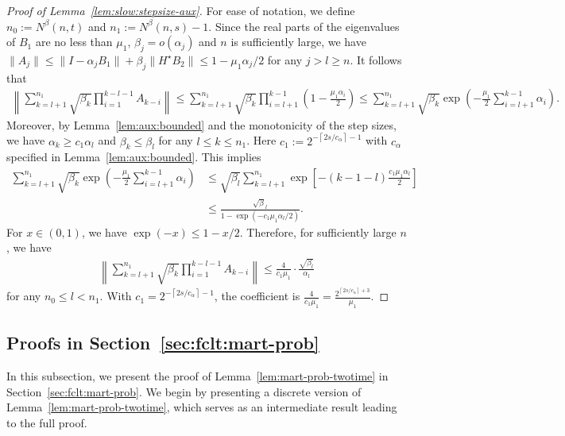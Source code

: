 \documentclass[11pt]{article}
\theoremstyle{plain}
\theoremstyle{definition}
\def\mI{{\bm{I}}}
\def\mI{{I}}
\begin{document}
\begin{appendix}
\begin{proof}[Proof of Lemma~\ref{lem:slow:stepsize-aux}]
    For ease of notation, we define $n_0 := N^\beta(n, t)$ and $n_1 := N^\beta(n, s)-1$.
    Since the real parts of the eigenvalues of $B_1$ are no less than $\mu_1$, $\beta_{j} = o(\alpha_{j})$ and $n$ is sufficiently large, we have $\| A_j \| \le \| \mI - \alpha_{j} B_1 \| + \beta_{j} \| H^\star B_2 \| \le  1 - \mu_1 \alpha_{j} / 2$ for any $j > l \ge n$.
    It follows that
    \begin{align*}
        \left\| \sum_{k=l+1}^{n_1} \sqrt{\beta_{k}} \prod_{i=1}^{k-l-1} A_{k-i}  \right\|
        \le \sum_{k=l+1}^{n_1} \sqrt{\beta_{k}} \prod_{i=l+1}^{k-1} \left( 1 {-} \frac{ \mu_1 \alpha_{i} }{2} \right)
        \le \sum_{k=l+1}^{n_1} \sqrt{\beta_{k}} \exp \left( - \frac{\mu_1}{2} \sum_{i=l+1}^{k-1} \alpha_{i} \right).
    \end{align*}
    Moreover, by Lemma~\ref{lem:aux:bounded} and the monotonicity of the step sizes, 
    we have
    $ \alpha_{k} \ge c_1 \alpha_{l}   $
    and $
    \beta_{k} \le \beta_{l}$ for any $l \le k \le n_1$.
    Here $c_1 := 2^{ -\left\lceil 2s/c_\alpha \right\rceil - 1}$ with $c_\alpha$ specified in Lemma~\ref{lem:aux:bounded}.
    This implies 
    \begin{align*}
        \sum_{k=l+1}^{n_1} \sqrt{\beta_{k}} \exp \left( - \frac{\mu_1}{2} \sum_{i=l+1}^{k-1} \alpha_{i} \right)
        & \le \sqrt{\beta_{l}} \sum_{k=l+1}^{n_1}  \exp \left[ - (k-1-l) \frac{c_1 \mu_1 \alpha_{l} }{2} \right] \\
        & \le \frac{ \sqrt{\beta}_{l} }{1 - \exp(- c_1 \mu_1 \alpha_{l} / 2) }.
    \end{align*}
    For $x \in (0,1)$, we have $\exp(-x) \le 1 - x/2$.
    Therefore, for sufficiently large $n$, we have
    \begin{align*}
        \left\| \sum_{k=l+1}^{n_1} \sqrt{\beta_{k}} \prod_{i=1}^{k-l-1} A_{k-i}  \right\|
        \le \frac{4  }{ c_1 \mu_1  } \cdot
        \frac{ \sqrt{\beta_{l} } }{ \alpha_{l} }
    \end{align*}
    for any $n_0 \le l < n_1$.
    With $c_1 = 2^{ -\left\lceil 2s/c_\alpha \right\rceil - 1}$, the coefficient is $\frac{4}{c_1 \mu_1} = \frac{ 2^{ \left\lceil 2s/c_\alpha \right\rceil + 3} }{\mu_1}$.
\end{proof}


\subsection{Proofs in Section~\ref{sec:fclt:mart-prob}}
\label{sec:proof:fclt:mart-prob}
In this subsection, we present the proof of Lemma~\ref{lem:mart-prob-twotime} in Section~\ref{sec:fclt:mart-prob}.
We begin by presenting a discrete version of Lemma~\ref{lem:mart-prob-twotime}, which serves as an intermediate result leading to the full proof.


\end{appendix}
\end{document}
